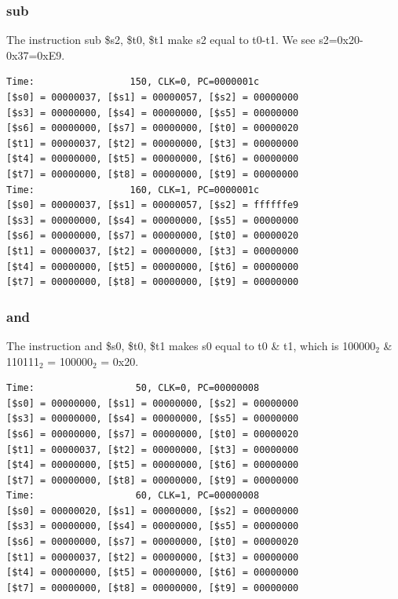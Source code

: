 \documentclass[a4paper,12pt]{article}
\begin{document}
\subsubsection{sub}
\par The instruction sub \$s2, \$t0, \$t1 make s2 equal to t0-t1. We see s2=0x20-0x37=0xE9.
\begin{lstlisting}
Time:                 150, CLK=0, PC=0000001c
[$s0] = 00000037, [$s1] = 00000057, [$s2] = 00000000
[$s3] = 00000000, [$s4] = 00000000, [$s5] = 00000000
[$s6] = 00000000, [$s7] = 00000000, [$t0] = 00000020
[$t1] = 00000037, [$t2] = 00000000, [$t3] = 00000000
[$t4] = 00000000, [$t5] = 00000000, [$t6] = 00000000
[$t7] = 00000000, [$t8] = 00000000, [$t9] = 00000000
Time:                 160, CLK=1, PC=0000001c
[$s0] = 00000037, [$s1] = 00000057, [$s2] = ffffffe9
[$s3] = 00000000, [$s4] = 00000000, [$s5] = 00000000
[$s6] = 00000000, [$s7] = 00000000, [$t0] = 00000020
[$t1] = 00000037, [$t2] = 00000000, [$t3] = 00000000
[$t4] = 00000000, [$t5] = 00000000, [$t6] = 00000000
[$t7] = 00000000, [$t8] = 00000000, [$t9] = 00000000
\end{lstlisting}

\subsubsection{and}
\par The instruction and \$s0, \$t0, \$t1 makes s0 equal to t0 \& t1, which is 100000$_2$ \& 110111$_2$ = 100000$_2$ = 0x20.

\begin{lstlisting}
Time:                  50, CLK=0, PC=00000008
[$s0] = 00000000, [$s1] = 00000000, [$s2] = 00000000
[$s3] = 00000000, [$s4] = 00000000, [$s5] = 00000000
[$s6] = 00000000, [$s7] = 00000000, [$t0] = 00000020
[$t1] = 00000037, [$t2] = 00000000, [$t3] = 00000000
[$t4] = 00000000, [$t5] = 00000000, [$t6] = 00000000
[$t7] = 00000000, [$t8] = 00000000, [$t9] = 00000000
Time:                  60, CLK=1, PC=00000008
[$s0] = 00000020, [$s1] = 00000000, [$s2] = 00000000
[$s3] = 00000000, [$s4] = 00000000, [$s5] = 00000000
[$s6] = 00000000, [$s7] = 00000000, [$t0] = 00000020
[$t1] = 00000037, [$t2] = 00000000, [$t3] = 00000000
[$t4] = 00000000, [$t5] = 00000000, [$t6] = 00000000
[$t7] = 00000000, [$t8] = 00000000, [$t9] = 00000000
\end{lstlisting}
\end{document}
